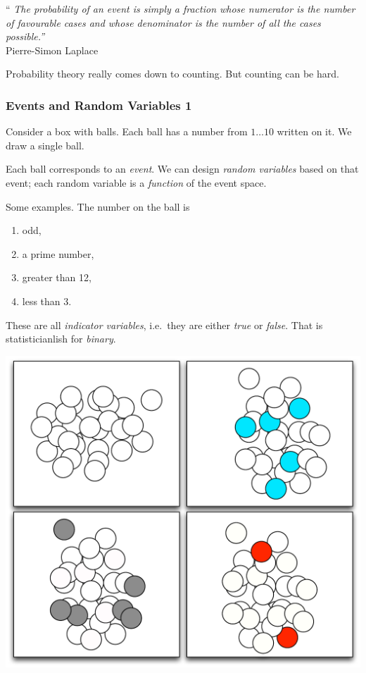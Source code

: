 \documentclass[USenglish,pdftex,compress,10pt,svgnamesi,handout]{beamer}
\begin{document}
\begin{frame}
\begin{flushright}{``\it 
The probability of an event is simply a fraction whose numerator is the number of favourable cases and whose denominator is the number of all the cases possible.''
}
\\ \medskip
Pierre-Simon Laplace
\end{flushright}

Probability theory really comes down to counting. But counting can be hard.

\end{frame}




\begin{frame}
\frametitle{Events and Random Variables 1}
Consider a box with balls. 
Each ball has a number from $1 \dots 10$ written on it.
We draw a single ball.

\medskip

Each ball corresponds to an \emph{event}.
We can design \emph{random variables} based on that event; each random variable is a \emph{function} of the event space.

\bigskip
\pause
Some examples. The number on the ball is
\begin{enumerate}
    \item odd,
    \item a prime number,
    \item greater than 12,
    \item less than 3.
\end{enumerate}
These are all \emph{indicator variables}, i.e.\ they are either \emph{true} or \emph{false}. That is statisticianlish for \emph{binary}.
\end{frame}


\begin{frame}
\center
\includegraphics[width=.8\linewidth]{pics/balls}
\end{frame}
\end{document}
